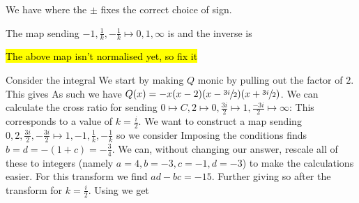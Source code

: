 \documentclass{article}
\begin{document}
\begin{corollary}
	We have
	where the $\pm$ fixes the correct choice of sign. 
\end{corollary}

\begin{lemma}
	The map sending $-1,\frac{1}{k},-\frac{1}{k} \mapsto 0,1,\infty$ is 
	and the inverse is 
\end{lemma}
\begin{remark}
	\hl{The above map isn't normalised yet, so fix it}
\end{remark}

\begin{example}
	Consider the integral 
	We start by making $Q$ monic by pulling out the factor of $2$. This gives 
	As such we have $Q(x) = -x(x-2)(x-\sfrac{3i}{2})(x+\sfrac{3i}{2})$. We can  calculate the cross ratio for sending $0 \mapsto C, 2 \mapsto 0, \frac{3i}{2} \mapsto 1, \frac{-3i}{2}\mapsto \infty$:
	This corresponds to a value of $k=\frac{i}{2}$. We want to construct a map sending $0,2,\frac{3i}{2},-\frac{3i}{2} \mapsto 1,-1,\frac{1}{k}, -\frac{1}{k}$ so we consider 
	Imposing the conditions finds $b=d=-(1+c) = -\frac{3}{4}$. We can, without changing our answer, rescale all of these to integers (namely $a=4, b=-3, c=-1, d=-3$) to make the calculations easier. For this transform we find $ad-bc=-15$. Further
	giving 
	so after the transform 
	for $k=\frac{i}{2}$. Using 
	we get 
\end{example}
\end{document}
